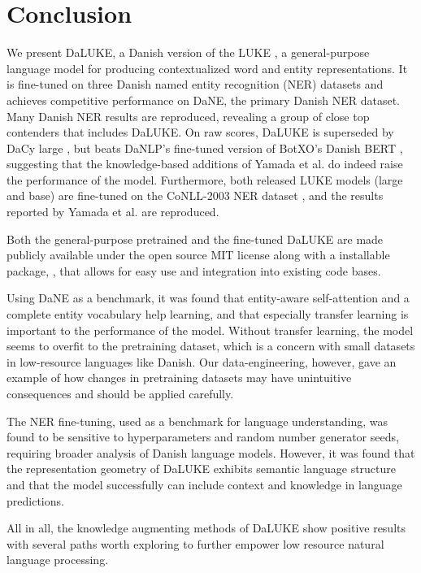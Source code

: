 \documentclass[main.tex]{subfiles}
\begin{document}
\chapter{Conclusion}
We present DaLUKE, a Danish version of the LUKE \cite{yamada2020luke}, a general-purpose language model for producing contextualized word and entity representations.
It is fine-tuned on three Danish named entity recognition (NER) datasets and achieves competitive performance on DaNE, the primary Danish NER dataset.
Many Danish NER results are reproduced, revealing a group of close top contenders that includes DaLUKE.
On raw scores, DaLUKE is superseded by DaCy large \cite{enevoldsen2020dacy}, but beats DaNLP's fine-tuned version of BotXO's Danish BERT \cite{danlp2021, botxo2019dabert}, suggesting that the knowledge-based additions of Yamada et al. \cite{yamada2020luke} do indeed raise the performance of the model.
Furthermore, both released LUKE models (large and base) are fine-tuned on the CoNLL-2003 NER dataset \cite{tjang2003conll}, and the results reported by Yamada et al. are reproduced.

Both the general-purpose pretrained and the fine-tuned DaLUKE are made publicly available under the open source MIT license along with a  installable package, , that allows for easy use and integration into existing code bases.

Using DaNE as a benchmark, it was found that entity-aware self-attention and a complete entity vocabulary help learning, and that especially transfer learning is important to the performance of the model.
Without transfer learning, the model seems to overfit to the pretraining dataset, which is a concern with small datasets in low-resource languages like Danish.
Our data-engineering, however, gave an example of how changes in pretraining datasets may have unintuitive consequences and should be applied carefully.

The NER fine-tuning, used as a benchmark for language understanding, was found to be sensitive to hyperparameters and random number generator seeds, requiring broader analysis of Danish language models.
However, it was found that the representation geometry of DaLUKE exhibits semantic language structure and that the model successfully can include context and knowledge in language predictions.

All in all, the knowledge augmenting methods of DaLUKE show positive results with several paths worth exploring to further empower low resource natural language processing.
\end{document}
